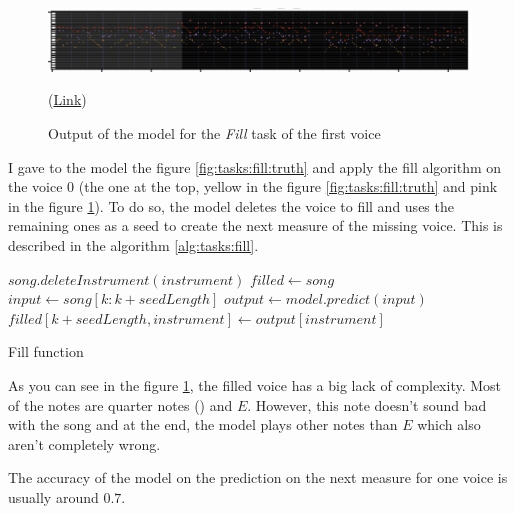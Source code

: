 \documentclass[12pt]{report}
\begin{document}
\begin{figure}[htbp]
    \centering
    \includegraphics[width=\textwidth]{images/generated_midis/tasks/fill/task-fill-0.jpg}
    \caption{Output of the model for the \textit{Fill} task of the first voice}
    (\href{https://github.com/ValentinVignal/midiGenerator/blob/master/samples/tasks/fill_1.mid}{Link})
    \label{fig:tasks:fill:0}
\end{figure}

I gave to the model the figure \ref{fig:tasks:fill:truth} and apply the fill algorithm on the voice $0$ (the one at the top, yellow in the figure \ref{fig:tasks:fill:truth} and pink in the figure \ref{fig:tasks:fill:0}).
To do so, the model deletes the voice to fill and uses the remaining ones as a seed to create the next measure of the missing voice.
This is described in the algorithm \ref{alg:tasks:fill}.


\begin{algorithm}
    \begin{algorithmic}[1]
        \Statex
            \State $song.deleteInstrument(instrument)$
            \State $filled \gets song$
                \State $input \gets song[k:k + seedLength]$
                \State $output \gets model.predict(input)$
                \State $filled[k + seedLength, instrument] \gets output[instrument]$
            \EndFor
            \State {}
        \EndFunction
        \end{algorithmic}
    \caption{Fill function}
    \label{alg:tasks:fill}
\end{algorithm}

As you can see in the figure \ref{fig:tasks:fill:0}, the filled voice has a big lack of complexity.
Most of the notes are quarter notes (\musQuarter) and $E$.
However, this note doesn't sound bad with the song and at the end, the model plays other notes than $E$ which also aren't completely wrong.

The accuracy of the model on the prediction on the next measure for one voice is usually around $0.7$.
\end{document}
